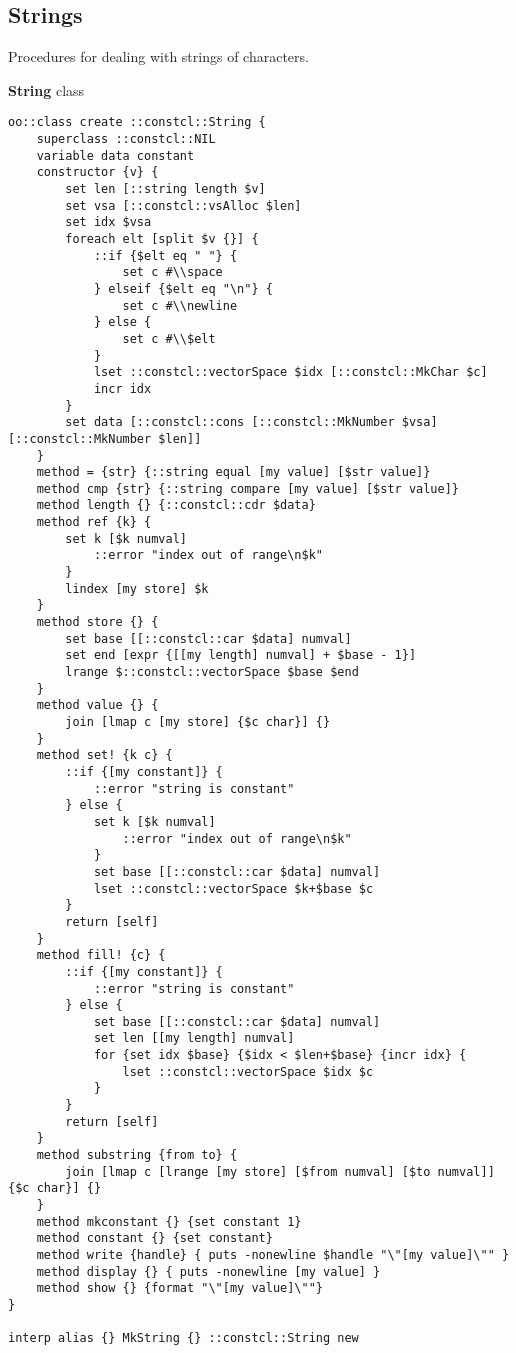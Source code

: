 \documentclass{report}
\begin{document}
\subsection{Strings}
\label{strings}

Procedures for dealing with strings of characters.


\textbf{String} class

\noindent\makebox[\linewidth]{\rule{\linewidth}{0.4pt}}
\begin{lstlisting}
oo::class create ::constcl::String {
    superclass ::constcl::NIL
    variable data constant
    constructor {v} {
        set len [::string length $v]
        set vsa [::constcl::vsAlloc $len]
        set idx $vsa
        foreach elt [split $v {}] {
            ::if {$elt eq " "} {
                set c #\\space
            } elseif {$elt eq "\n"} {
                set c #\\newline
            } else {
                set c #\\$elt
            }
            lset ::constcl::vectorSpace $idx [::constcl::MkChar $c]
            incr idx
        }
        set data [::constcl::cons [::constcl::MkNumber $vsa] [::constcl::MkNumber $len]]
    }
    method = {str} {::string equal [my value] [$str value]}
    method cmp {str} {::string compare [my value] [$str value]}
    method length {} {::constcl::cdr $data}
    method ref {k} {
        set k [$k numval]
            ::error "index out of range\n$k"
        }
        lindex [my store] $k
    }
    method store {} {
        set base [[::constcl::car $data] numval]
        set end [expr {[[my length] numval] + $base - 1}]
        lrange $::constcl::vectorSpace $base $end
    }
    method value {} {
        join [lmap c [my store] {$c char}] {}
    }
    method set! {k c} {
        ::if {[my constant]} {
            ::error "string is constant"
        } else {
            set k [$k numval]
                ::error "index out of range\n$k"
            }
            set base [[::constcl::car $data] numval]
            lset ::constcl::vectorSpace $k+$base $c
        }
        return [self]
    }
    method fill! {c} {
        ::if {[my constant]} {
            ::error "string is constant"
        } else {
            set base [[::constcl::car $data] numval]
            set len [[my length] numval]
            for {set idx $base} {$idx < $len+$base} {incr idx} {
                lset ::constcl::vectorSpace $idx $c
            }
        }
        return [self]
    }
    method substring {from to} {
        join [lmap c [lrange [my store] [$from numval] [$to numval]] {$c char}] {}
    }
    method mkconstant {} {set constant 1}
    method constant {} {set constant}
    method write {handle} { puts -nonewline $handle "\"[my value]\"" }
    method display {} { puts -nonewline [my value] }
    method show {} {format "\"[my value]\""}
}
 
interp alias {} MkString {} ::constcl::String new
\end{lstlisting}
\end{document}
